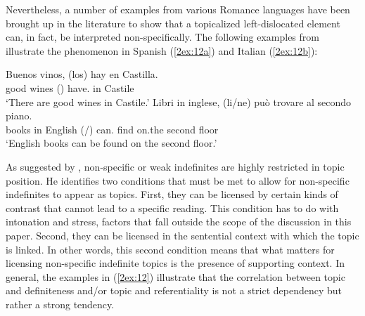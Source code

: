 \documentclass[output=paper]{langsci/langscibook}
\begin{document}
Nevertheless, a number of examples from various Romance languages have been brought up in the literature to show that a topicalized left-dislocated element can, in fact, be interpreted non-specifically. The following examples from \cite{leonetti:10} illustrate the phenomenon in Spanish (\ref{2ex:12a}) and Italian (\ref{2ex:12b}):

\begin{exe}
\ex\label{2ex:12}
	\begin{xlista}
	\ex\label{2ex:12a}
	\gll	Buenos	vinos, 	(los) 				hay 				en	Castilla. \\
		good 	wines	({}) 	have.{}	in 	Castile \\
	\glt 	`There are good wines in Castile.'
	\ex\label{2ex:12b}
	\gll	Libri 		in	inglese,	{(li/ne)} 						può 				trovare	al 	 	secondo	piano. \\
		books 	in 	English 	{({}/{})}	can.{}	find		on.the	second 	floor \\
	\glt	`English books can be found on the second floor.'
	\end{xlista}
\end{exe}

As suggested by \cite{leonetti:10}, non-specific or weak indefinites are highly restricted in topic position. He identifies two conditions that must be met to allow for non-specific indefinites to appear as topics. First, they can be licensed by certain kinds of contrast that cannot lead to a specific reading. This condition has to do with intonation and stress, factors that fall outside the scope of the discussion in this paper. Second, they can be licensed in the sentential context with which the topic is linked. In other words, this second condition means that what matters for licensing non-specific indefinite topics is the presence of supporting context. In general, the examples in (\ref{2ex:12}) illustrate that the correlation between topic and definiteness and/or topic and referentiality is not a strict dependency but rather a strong tendency. 
\end{document}
